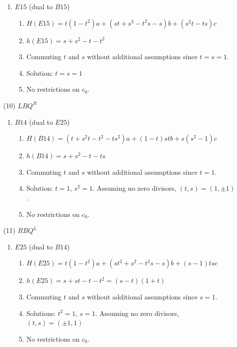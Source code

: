 \documentclass[11pt]{amsart}
\theoremstyle{definition}
\begin{document}
\begin{enumerate}
\begin{enumerate}
             \item $E15$ (dual to $B15$)
            \begin{enumerate}
                \item  $H(E15) = t(1-t^2)a + (st+s^3 -t^2s-s)b +(s^2t-ts)c$
                \item   $h(E15) = s+s^2 -t -t^2 $
                \item Commuting $t$ and $s$ without additional assumptions since $t=s=1$.
                \item Solution: $t=s=1$
                \item No restrictions on $c_0$.
            \end{enumerate}
        \end{enumerate}

 \item[(10)] $LBQ^R$
        \begin{enumerate}
            \item $B14$ (dual to $E25$)
            \begin{enumerate}
                \item  $H(B14) = (t+s^2t-t^2-ts^2)a+(1-t)stb+s(s^2-1)c$
                \item  $h(B14) = s+s^2-t-ts$ 
                \item Commuting $t$ and $s$ without additional assumptions since $t=1$.
                \item Solution: $t=1$, $s^2 = 1$. Assuming no zero divisors, $(t,s) = ( 1, \pm 1)$.
                \item No restrictions on $c_0$.
            \end{enumerate}
        \end{enumerate}

 \item[(11)] $RBQ^L$
        \begin{enumerate}
            \item $E25$ (dual to $B14$)
            \begin{enumerate}
                \item $H(E25)= t(1-t^2)a+(st^2+s^2-t^2s-s)b+(s-1)tsc $
                \item $h(E25) = s+st -t -t^2=(s-t)(1+t)$
                \item Commuting $t$ and $s$ without additional assumptions since $s=1$.
                \item Solutions: $t^2 = 1$, $s=1$. Assuming no zero divisors, $(t,s) = ( \pm 1, 1)$
                \item No restrictions on $c_0$.
            \end{enumerate}
        \end{enumerate}


\end{enumerate}
\end{document}
